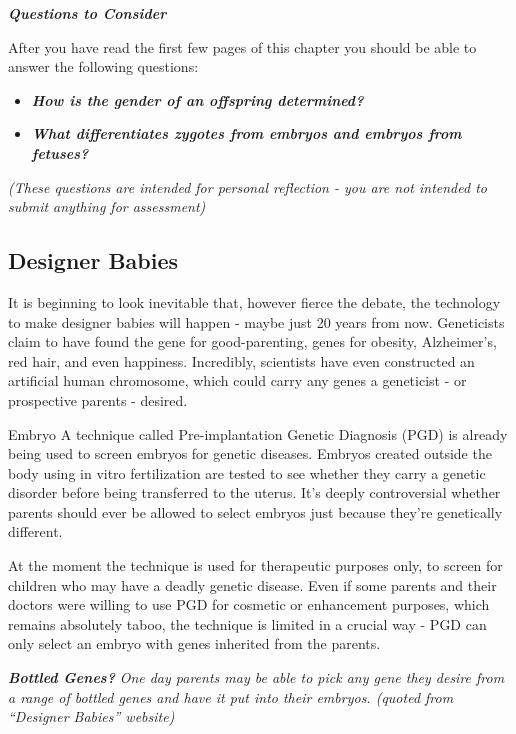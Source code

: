 \documentclass[
]{book}
\providecommand{\tightlist}{%
  \setlength{\itemsep}{0pt}\setlength{\parskip}{0pt}}
\begin{document}
\textbf{\emph{Questions to Consider}}

After you have read the first few pages of this chapter you should be able to answer the following questions:

\begin{itemize}
\tightlist
\item
  \textbf{\emph{How is the gender of an offspring determined?}}
\item
  \textbf{\emph{What differentiates zygotes from embryos and embryos from fetuses?}}
\end{itemize}

\emph{(These questions are intended for personal reflection - you are not intended to submit anything for assessment)}

\hypertarget{designer-babies}{%
\subsection*{Designer Babies}\label{designer-babies}}

It is beginning to look inevitable that, however fierce the debate, the technology to make designer babies will happen - maybe just 20 years from now. Geneticists claim to have found the gene for good-parenting, genes for obesity, Alzheimer's, red hair, and even happiness. Incredibly, scientists have even constructed an artificial human chromosome, which could carry any genes a geneticist - or prospective parents - desired.

Embryo A technique called Pre-implantation Genetic Diagnosis (PGD) is already being used to screen embryos for genetic diseases. Embryos created outside the body using in vitro fertilization are tested to see whether they carry a genetic disorder before being transferred to the uterus. It's deeply controversial whether parents should ever be allowed to select embryos just because they're genetically different.

At the moment the technique is used for therapeutic purposes only, to screen for children who may have a deadly genetic disease. Even if some parents and their doctors were willing to use PGD for cosmetic or enhancement purposes, which remains absolutely taboo, the technique is limited in a crucial way - PGD can only select an embryo with genes inherited from the parents.

\textbf{\emph{Bottled Genes?}} \emph{One day parents may be able to pick any gene they desire from a range of bottled genes and have it put into their embryos. (quoted from ``Designer Babies'' website)}
\end{document}

